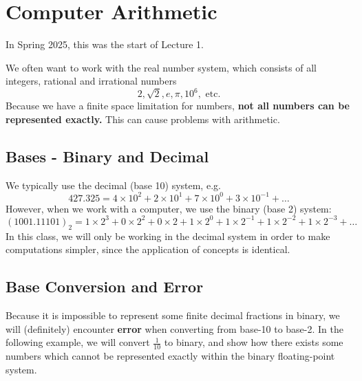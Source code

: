 \section{Computer Arithmetic}
\begin{greenquote}
  In Spring 2025, this was the start of Lecture 1.
\end{greenquote}

We often want to work with the real number system, which consists of all 
integers, rational and irrational numbers
\begin{equation*}
  2, \sqrt{2}, e, \pi, 10^6, \text{ etc.} 
\end{equation*}
Because we have a finite space limitation for numbers, 
\textbf{not all numbers can be represented exactly.} This can cause problems
with arithmetic.

\subsection{Bases - Binary and Decimal}

We typically use the decimal (base 10) system, e.g.
\begin{equation*}
  427.325 = 4 \times 10^2 + 2 \times 10^1 + 7 \times 10^{0} + 3 \times 10^{-1}+\dots
\end{equation*}
However, when we work with a computer, we use the binary (base 2) system:
\begin{equation*}
  (1001.11101)_2 = 1\times 2^3 + 0\times 2^2 + 0\times 2 + 1\times 2^0 + 1\times 2^{-1} + 1\times 2^{-2} + 1\times 2^{-3} +\dots
\end{equation*}
In this class, we will only be working in the decimal system in order to make
computations simpler, since the application of concepts is identical.

\subsection{Base Conversion and Error}

Because it is impossible to represent some finite decimal fractions in binary,
we will (definitely) encounter \textbf{error} when converting from base-10 to
base-2. In the following example, we will convert $\frac{1}{10}$ to binary, and
show how there exists some numbers which cannot be represented exactly within 
the binary floating-point system.


